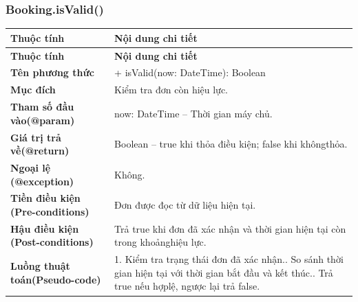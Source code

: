 \subsubsection{Booking.isValid()}
\begin{longtable}{|L{0.24\textwidth}|L{0.70\textwidth}|}
\hline
\textbf{Thuộc tính} & \textbf{Nội dung chi tiết} \\
\hline
\endfirsthead
\hline
\textbf{Thuộc tính} & \textbf{Nội dung chi tiết} \\
\hline
\endhead
\textbf{Tên phương thức} & + isValid(now: DateTime): Boolean \\
\hline
\textbf{Mục đích} & Kiểm tra đơn còn hiệu lực. \\
\hline
\textbf{Tham số đầu vào}\newline \textbf{(@param)} & now: DateTime – Thời gian máy chủ. \\
\hline
\textbf{Giá trị trả về(@return)} & Boolean – true khi thỏa điều kiện; false khi khôngthỏa. \\
\hline
\textbf{Ngoại lệ (@exception)} & Không. \\
\hline
\textbf{Tiền điều kiện (Pre-}\newline \textbf{conditions)} & Đơn được đọc từ dữ liệu hiện tại. \\
\hline
\textbf{Hậu điều kiện (Post-}\newline \textbf{conditions)} & Trả true khi đơn đã xác nhận và thời gian hiện tại còn trong khoảng\newline hiệu lực. \\
\hline
\textbf{Luồng thuật toán}\newline \textbf{(Pseudo-code)} & 1. Kiểm tra trạng thái đơn đã xác nhận.. So sánh thời gian hiện tại với thời gian bắt đầu và kết thúc.. Trả true nếu hợplệ, ngược lại trả false. \\
\hline
\end{longtable}
\vspace{-0.5\baselineskip}
